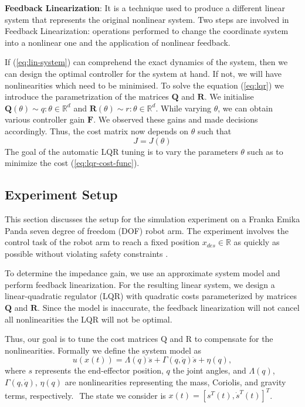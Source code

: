 \textbf{Feedback Linearization}: It is a technique used to produce a different linear system that represents the original nonlinear system. Two steps are involved in Feedback Linearization: operations performed to change the coordinate system into a nonlinear one and the application of nonlinear feedback.

If (\ref{eq:lin-system}) can comprehend the exact dynamics of the system, then we can design the optimal controller for the system at hand. If not, we will have nonlinearities which need to be minimised. To solve the equation (\ref{eq:lqr}) we introduce the parametrization of the matrices $\boldsymbol{Q}$ and $\boldsymbol{R}$. We initialise $\boldsymbol{Q}(\theta) \sim q : \theta \in \mathbb{R}^d$ and $\boldsymbol{R}(\theta) \sim r : \theta \in \mathbb{R}^d$.
While varying $\theta$, we can obtain various controller gain $\boldsymbol{F}$. We observed these gains and made decisions accordingly. Thus, the cost matrix now depends on $\theta$ such that
\begin{equation}
J=J(\theta)
\end{equation}
The goal of the automatic LQR tuning is to vary the parameters $\theta$ such as to minimize the cost (\ref{eq:lqr-cost-func}).

\subsection{Experiment Setup}
\label{subsec:exp-setup}
This section discusses the setup for the simulation experiment on a Franka Emika Panda seven degree of freedom (DOF) robot arm. The experiment involves the control task of the robot arm to reach a fixed position $x_{des} \in \mathbb{R}$ as quickly as possible without violating safety constraints \cite{gosafeopt}.

To determine the impedance gain, we use an approximate system model and perform feedback linearization. For the resulting linear system, we design a linear-quadratic regulator (LQR) with quadratic costs parameterized by matrices $\boldsymbol{Q}$ and $\boldsymbol{R}$. Since the model is inaccurate, the feedback linearization will not cancel all nonlinearities the LQR will not be optimal. 

Thus, our goal is to tune the cost matrices Q and R to compensate for the nonlinearities. Formally we define the system model as
\begin{equation}\label{eq:modellqr}
u(x(t)) = \Lambda(q) \ddot{s} + \Gamma(q,\dot{q})\dot{s} + \eta(q),
\end{equation}
where $s$ represents\textcolor{white}{"}the end-effector position, $q$ the joint angles, and $\Lambda(q)$,
$\Gamma(q,\dot{q})$, $\eta(q)$ are nonlinearities representing the mass, Coriolis, and gravity terms, respectively.\textcolor{white}{"} The state we consider is $x(t)=[s^T(t), \dot{s}^T(t)]^T$.

